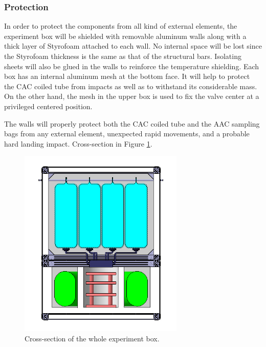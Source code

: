 \documentclass[a4paper,12pt,twoside]{article}
\providecommand{\DIFaddbegin}{} %
\providecommand{\DIFaddend}{} %
\newcommand{\DIFaddincludegraphics}[2][]{{\color{blue}\fbox{\DIFOincludegraphics[#1]{#2}}}} %
\DeclareRobustCommand{\DIFaddbegin}{\DIFOaddbegin \let\includegraphics\DIFaddincludegraphics} %
\DeclareRobustCommand{\DIFaddend}{\DIFOaddend \let\includegraphics\DIFOincludegraphics} %
\begin{document}
\DIFaddbegin \pagebreak
\DIFaddend \subsubsection{Protection}

In order to protect the components from all kind of external elements, the experiment box will be shielded with removable aluminum walls along with a thick layer of Styrofoam attached to each wall. No internal space will be lost since the Styrofoam thickness is the same as that of the structural bars. Isolating sheets will also be glued in the walls to reinforce the temperature shielding. Each box has an internal aluminum mesh at the bottom face. It will help to protect the CAC coiled tube from impacts as well as to withstand its considerable mass. On the other hand, the mesh in the upper box is used to fix the valve center at a privileged centered position.

The walls will properly protect both the CAC coiled tube and the AAC sampling bags from any external element, unexpected rapid movements, and a probable hard landing impact. Cross-section in Figure \ref{cut_all}. 



\begin{figure}[!ht]
    \centering
    \includegraphics[width=0.7\textwidth]{4-experiment-design/img/tall_frontal.jpg}
    \caption{Cross-section of the whole experiment box.}
    \label{cut_all}
\end{figure}
\end{document}
